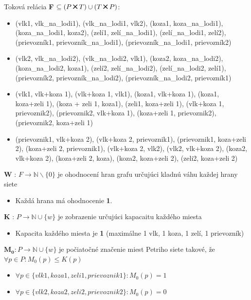 \documentclass[11pt,a4paper]{article}
\newcommand{\Cross}{\mathbin{\tikz [x=1.4ex,y=1.4ex,line width=.2ex] \draw (0,0) -- (1,1) (0,1) -- (1,0);}}
\begin{document}
Toková relácia  \textbf{F} $ \subseteq (P \Cross T) \cup (T \Cross P) $:
\begin{itemize}
    \item (vlk1, vlk\_na\_lodi1), (vlk\_na\_lodi1, vlk2), (koza1, koza\_na\_lodi1), (koza\_na\_lodi1, koza2), (zelí1, zelí\_na\_lodi1), (zelí\_na\_lodi1, zelí2), (prievozník1, prievozník\_na\_lodi1), (prievozník\_na\_lodi1, prievozník2)
    \item (vlk2, vlk\_na\_lodi2), (vlk\_na\_lodi2, vlk1), (koza2, koza\_na\_lodi2), (koza\_na\_lodi2, koza1), (zelí2, zelí\_na\_lodi2), (zelí\_na\_lodi2, zelí1), (prievozník2, prievozník\_na\_lodi2), (prievozník\_na\_lodi2, prievozník1)
    \item (vlk1, vlk+koza 1), (vlk+koza 1, vlk1), (koza1, vlk+koza 1), (koza1, koza+zeli 1), (koza + zeli 1, koza1), (zeli1, koza+zeli 1), (vlk+koza 1, prievoznik2), (prievoznik2, vlk+koza 1), (koza+zeli 1, prievoznik2), (prievoznik2, koza+zeli 1)
    \item (prievoznik1, vlk+koza 2), (vlk+koza 2, prievoznik1), (prievoznik1, koza+zeli 2), (koza+zeli 2, prievoznik1), (vlk+koza 2, vlk2), (vlk2, vlk+koza 2), (koza2, vlk+koza 2), (koza+zeli 2, koza), (koza2, koza+zeli 2), (zeli2, koza+zeli 2)
\end{itemize}

\textbf{W} : $ F \rightarrow \mathbb N  \backslash \{0\}$ je ohodnocení hran grafu určujúci kladnú váhu každej hrany siete
\begin{itemize}
    \item Každá hrana má ohodnocenie \textbf{1}.
\end{itemize}

\textbf{K} : $ P \rightarrow \mathbb N \cup \{w\} $ je zobrazenie určujúci kapacaitu každého miesta
\begin{itemize}
    \item Kapacita každého miesta je \textbf{1} (maximálne 1 vlk, 1 koza, 1 zelí, 1 prievozník)
\end{itemize}

$\mathbf{M_0} : P \rightarrow \mathbb N \cup \{w\} $ je počiatočné značenie miest Petriho siete takové, že $ \forall p \in P: M_0(p) \leq K(p) $
\begin{itemize}
    \item $\forall p \in \{ vlk1, koza1, zeli1, prievoznik1 \} : M_0(p) = 1 $
    \item $\forall p \in \{ vlk2, koza2, zeli2, prievoznik2 \} : M_0(p) = 0 $
\end{itemize}
\end{document}
